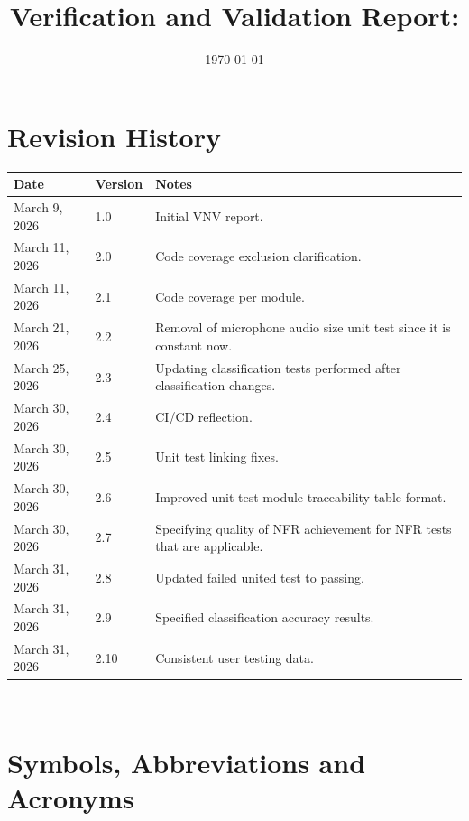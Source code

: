 \documentclass[12pt, titlepage]{article}
\begin{document}
\title{Verification and Validation Report: \progname} 
\author{\authname}
\date{\today}
	
\maketitle


\section{Revision History}

\begin{tabularx}{\textwidth}{p{3cm}p{2cm}X} \hline {\bf Date} & {\bf Version} &
{\bf Notes}\\
\hline
March 9, 2026 & 1.0 & Initial VNV report. \\
March 11, 2026 & 2.0 & Code coverage exclusion clarification. \\
March 11, 2026 & 2.1 & Code coverage per module. \\
March 21, 2026 & 2.2 & Removal of microphone audio size unit test since it
    is constant now. \\
March 25, 2026 & 2.3 & Updating classification tests performed after 
classification changes. \\
March 30, 2026 & 2.4 & CI/CD reflection. \\
March 30, 2026 & 2.5 & Unit test linking fixes. \\
March 30, 2026 & 2.6 & Improved unit test module traceability table format. \\
March 30, 2026 & 2.7 & Specifying quality of NFR achievement for NFR tests that
    are applicable. \\
March 31, 2026 & 2.8 & Updated failed united test to passing. \\
March 31, 2026 & 2.9 & Specified classification accuracy results. \\
March 31, 2026 & 2.10 & Consistent user testing data. \\
\hline
\end{tabularx}

~\newpage

\section{Symbols, Abbreviations and Acronyms}
\end{document}
